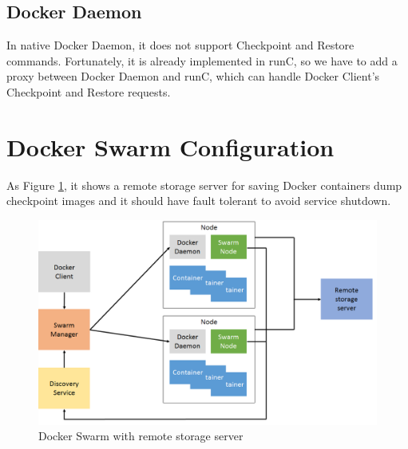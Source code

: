 \subsection{Docker Daemon}
In native Docker Daemon, it does not support Checkpoint and Restore commands.
Fortunately, it is already implemented in runC, so we have to add a proxy between Docker Daemon and runC, which can handle Docker Client's Checkpoint and Restore requests.

\section{Docker Swarm Configuration}
As Figure \ref{fig:Docker Swarm with remote storage server}, it shows a remote storage server for saving Docker containers dump checkpoint images and it should have fault tolerant to avoid service shutdown.

\begin{figure}[h]
\begin{center}
\includegraphics[width=15cm]{figure/swarm_docker_remote.png}
\end{center}
\caption{Docker Swarm with remote storage server}
\label{fig:Docker Swarm with remote storage server}
\end{figure}

